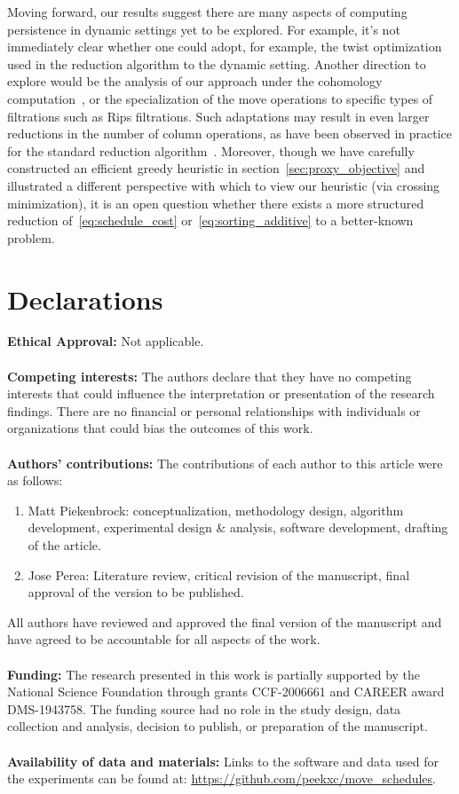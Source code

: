 \documentclass[sn-mathphys]{sn-jnl}
\begin{document}
Moving forward, our results suggest there are many aspects of computing persistence in dynamic settings yet to be explored. 
For example, it's not immediately clear whether one could adopt, for example, the twist optimization~\cite{chen2011persistent} used in the reduction algorithm to the dynamic setting. Another direction to explore would be the analysis of our approach under the cohomology computation~\cite{de2011dualities}, or the specialization of the move operations to specific types of filtrations such as Rips filtrations. Such adaptations may result in even larger reductions in the number of column operations, as have been observed in practice for the standard reduction algorithm~\cite{bauer2021ripser}. 
Moreover, though we have carefully constructed an efficient greedy heuristic in section~\ref{sec:proxy_objective} and illustrated a different perspective with which to view our heuristic (via crossing minimization), it is an open question whether there exists a more structured reduction of~\eqref{eq:schedule_cost} or~\eqref{eq:sorting_additive} to a better-known problem. 


\section{Declarations}
 
\textbf{Ethical Approval:} Not applicable.
\\
\\
\noindent \textbf{Competing interests:} 
The authors declare that they have no competing interests that could influence the interpretation or presentation of the research findings. There are no financial or personal relationships with individuals or organizations that could bias the outcomes of this work.
\\
\\
\noindent
\textbf{Authors' contributions:}
The contributions of each author to this article were as follows:
\begin{enumerate}
	\item Matt Piekenbrock: conceptualization, methodology design, algorithm development, experimental design \& analysis, software development, drafting of the article. 
	\item Jose Perea: Literature review, critical revision of the manuscript, final approval of the version to be published.
\end{enumerate}
All authors have reviewed and approved the final version of the manuscript and have agreed to be accountable for all aspects of the work.
\\
\\
\noindent 
\textbf{Funding:}
The research presented in this work is partially supported by the National Science Foundation through grants CCF-2006661 and CAREER award DMS-1943758. The funding source had no role in the study design, data collection and analysis, decision to publish, or preparation of the manuscript.
\\
\\
\noindent \textbf{Availability of data and materials:} Links to the software and data used for the experiments can be found at: \url{https://github.com/peekxc/move_schedules}.
\end{document}
